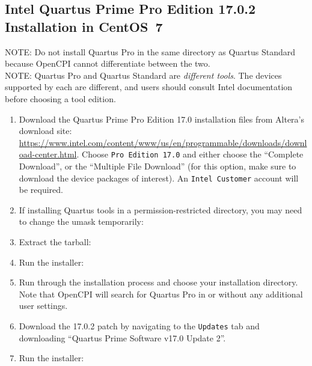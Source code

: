 \subsection{Intel Quartus Prime Pro Edition 17.0.2 Installation in CentOS~7}
\begin{flushleft}
	NOTE: Do not install Quartus Pro in the same directory as Quartus Standard because OpenCPI cannot differentiate between the two.\\
	NOTE: Quartus Pro and Quartus Standard are \textit{different tools}. The devices supported by each are different, and users should consult Intel documentation before choosing a tool edition.
\begin{enumerate}
	\item Download the Quartus Prime Pro Edition 17.0 installation files from Altera's download site: \url{https://www.intel.com/content/www/us/en/programmable/downloads/download-center.html}. Choose \verb+Pro Edition 17.0+ and either choose the ``Complete Download'', or the ``Multiple File Download'' (for this option, make sure to download the device packages of interest). An \verb+Intel Customer+ account will be required.
\item If installing Quartus tools in a permission-restricted directory, you may need to change the umask temporarily:\newline
{}\newline
{}
\item Extract the tarball:\newline
{}
\item Run the installer:\newline
{}\newline
\item Run through the installation process and choose your installation directory. Note that OpenCPI will search for Quartus Pro in  or  without any additional user settings.
\item Download the 17.0.2 patch by navigating to the \verb+Updates+ tab and downloading ``Quartus Prime Software v17.0 Update 2''.
\item Run the installer:\newline
\end{enumerate}


\end{flushleft}
